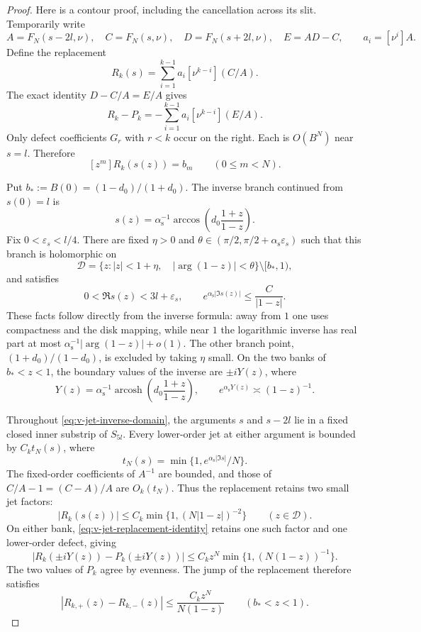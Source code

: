 \begin{proof}
Here is a contour proof, including the cancellation across its slit.
Temporarily write
\[
 A=F_N(s-2 l,\nu),\quad C=F_N(s,\nu),\quad
 D=F_N(s+2 l,\nu),\quad E=AD-C,
 \qquad a_i=[\nu^i]A.
\]
Define the replacement
\[
 R_k(s)=\sum_{i=1}^{k-1}a_i[\nu^{k-i}](C/A).
\]
The exact identity $D-C/A=E/A$ gives
\begin{equation}\label{eq:v-jet-replacement-identity}
 R_k-P_k=-\sum_{i=1}^{k-1}a_i[\nu^{k-i}](E/A).
\end{equation}
Only defect coefficients $G_r$ with $r<k$ occur on the right.  Each is
$O(B^N)$ near $s= l$.  Therefore
\begin{equation}\label{eq:v-jet-replacement-coefficients}
 [z^m]R_k(s(z))=b_m\qquad(0\le m<N).
\end{equation}

Put $b_*:=B(0)=(1-d_0)/(1+d_0)$.  The inverse branch continued from
$s(0)= l$ is
\[
 s(z)=\alpha_{\mathrm s}^{-1}
       \arccos\left(d_0\frac{1+z}{1-z}\right).
\]
Fix $0<\varepsilon_s< l/4$.  There are fixed $\eta>0$ and
$\theta\in(\pi/2,\pi/2+\alpha_{\mathrm s}\varepsilon_s)$ such that
this branch is holomorphic on
\[
 \mathcal D=\{z:|z|<1+\eta,\quad
                    |\arg(1-z)|<\theta\}\setminus[b_*,1),
\]
and satisfies
\begin{equation}\label{eq:v-jet-inverse-domain}
 0<\Re s(z)<3 l+\varepsilon_s,
 \qquad e^{\alpha_{\mathrm s}|\Im s(z)|}\le\frac C{|1-z|}.
\end{equation}
These facts follow directly from the inverse formula: away from $1$
one uses compactness and the disk mapping, while near $1$ the logarithmic
inverse has real part at most
$\alpha_{\mathrm s}^{-1}|\arg(1-z)|+o(1)$.
The other branch point, $(1+d_0)/(1-d_0)$, is excluded by taking $\eta$
small.  On the two banks of $b_*<z<1$, the boundary values of the
inverse are $\pm iY(z)$, where
\[
 Y(z)=\alpha_{\mathrm s}^{-1}
       \operatorname{arcosh}\left(d_0\frac{1+z}{1-z}\right),
 \qquad e^{\alpha_{\mathrm s}Y(z)}\asymp(1-z)^{-1}.
\]

Throughout \eqref{eq:v-jet-inverse-domain}, the arguments $s$ and
$s-2 l$ lie in a fixed closed inner substrip of $S_{5 l}$.
Every lower-order jet at either argument is bounded by
$C_k t_N(s)$, where
\[
 t_N(s)=\min\{1,e^{\alpha_{\mathrm s}|\Im s|}/N\}.
\]
The fixed-order coefficients of $A^{-1}$ are bounded, and those of
$C/A-1=(C-A)/A$ are $O_k(t_N)$.  Thus the replacement retains two small
jet factors:
\begin{equation}\label{eq:v-jet-replacement-size}
 |R_k(s(z))|\le C_k\min\{1,(N|1-z|)^{-2}\}
       \qquad(z\in\mathcal D).
\end{equation}
On either bank, \eqref{eq:v-jet-replacement-identity} retains one such
factor and one lower-order defect, giving
\[
 |R_k(\pm iY(z))-P_k(\pm iY(z))|
       \le C_k z^N\min\{1,(N(1-z))^{-1}\}.
\]
The two values of $P_k$ agree by evenness.  The jump of the replacement
therefore satisfies
\begin{equation}\label{eq:v-jet-bank-jump}
 |R_{k,+}(z)-R_{k,-}(z)|
       \le\frac{C_k z^N}{N(1-z)}\qquad(b_*<z<1).
\end{equation}


\end{proof}
